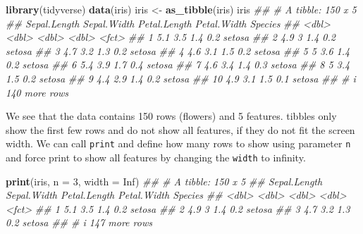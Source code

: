 \documentclass[
  notitlepage]{book}
\newenvironment{Shaded}{\begin{snugshade}}{\end{snugshade}}
\newcommand{\CommentTok}[1]{\textcolor[rgb]{0.56,0.35,0.01}{\textit{#1}}}
\newcommand{\DataTypeTok}[1]{\textcolor[rgb]{0.13,0.29,0.53}{#1}}
\newcommand{\DecValTok}[1]{\textcolor[rgb]{0.00,0.00,0.81}{#1}}
\newcommand{\KeywordTok}[1]{\textcolor[rgb]{0.13,0.29,0.53}{\textbf{#1}}}
\newcommand{\NormalTok}[1]{#1}
\newcommand{\OtherTok}[1]{\textcolor[rgb]{0.56,0.35,0.01}{#1}}
\newcommand{\StringTok}[1]{\textcolor[rgb]{0.31,0.60,0.02}{#1}}
\begin{document}
\begin{Shaded}
\begin{Highlighting}[]
\KeywordTok{library}\NormalTok{(tidyverse)}
\KeywordTok{data}\NormalTok{(iris)}
\NormalTok{iris \textless{}{-}}\StringTok{ }\KeywordTok{as\_tibble}\NormalTok{(iris)}
\NormalTok{iris}
\CommentTok{\#\# \# A tibble: 150 x 5}
\CommentTok{\#\#    Sepal.Length Sepal.Width Petal.Length Petal.Width Species}
\CommentTok{\#\#           \textless{}dbl\textgreater{}       \textless{}dbl\textgreater{}        \textless{}dbl\textgreater{}       \textless{}dbl\textgreater{} \textless{}fct\textgreater{}  }
\CommentTok{\#\#  1          5.1         3.5          1.4         0.2 setosa }
\CommentTok{\#\#  2          4.9         3            1.4         0.2 setosa }
\CommentTok{\#\#  3          4.7         3.2          1.3         0.2 setosa }
\CommentTok{\#\#  4          4.6         3.1          1.5         0.2 setosa }
\CommentTok{\#\#  5          5           3.6          1.4         0.2 setosa }
\CommentTok{\#\#  6          5.4         3.9          1.7         0.4 setosa }
\CommentTok{\#\#  7          4.6         3.4          1.4         0.3 setosa }
\CommentTok{\#\#  8          5           3.4          1.5         0.2 setosa }
\CommentTok{\#\#  9          4.4         2.9          1.4         0.2 setosa }
\CommentTok{\#\# 10          4.9         3.1          1.5         0.1 setosa }
\CommentTok{\#\# \# i 140 more rows}
\end{Highlighting}
\end{Shaded}

We see that the data contains 150 rows (flowers) and 5 features. tibbles
only show the first few rows and do not show all features, if they do
not fit the screen width. We can call \texttt{print} and define how many rows
to show using parameter \texttt{n} and force print to show all features by
changing the \texttt{width} to infinity.

\begin{Shaded}
\begin{Highlighting}[]
\KeywordTok{print}\NormalTok{(iris, }\DataTypeTok{n =} \DecValTok{3}\NormalTok{, }\DataTypeTok{width =} \OtherTok{Inf}\NormalTok{)}
\CommentTok{\#\# \# A tibble: 150 x 5}
\CommentTok{\#\#   Sepal.Length Sepal.Width Petal.Length Petal.Width Species}
\CommentTok{\#\#          \textless{}dbl\textgreater{}       \textless{}dbl\textgreater{}        \textless{}dbl\textgreater{}       \textless{}dbl\textgreater{} \textless{}fct\textgreater{}  }
\CommentTok{\#\# 1          5.1         3.5          1.4         0.2 setosa }
\CommentTok{\#\# 2          4.9         3            1.4         0.2 setosa }
\CommentTok{\#\# 3          4.7         3.2          1.3         0.2 setosa }
\CommentTok{\#\# \# i 147 more rows}
\end{Highlighting}
\end{Shaded}
\end{document}
